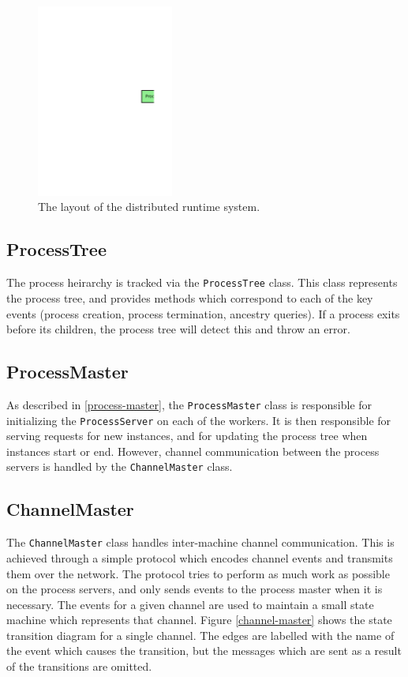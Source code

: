 \begin{figure}[H]
  \centering
  \includegraphics[width=0.4\textwidth]{diagrams/distributed_system}
  \caption{The layout of the distributed runtime system.}
  \label{dist-model}
\end{figure}

\subsection{ProcessTree}

The process heirarchy is tracked via the \texttt{ProcessTree} class. This class
represents the process tree, and provides methods which correspond to each of
the key events (process creation, process termination, ancestry queries). If
a process exits before its children, the process tree will detect this and throw
an error.

\subsection{ProcessMaster}

As described in \ref{process-master}, the \texttt{ProcessMaster} class is
responsible for initializing the \texttt{ProcessServer} on each of the workers.
It is then responsible for serving requests for new instances, and for updating
the process tree when instances start or end. However, channel communication
between the process servers is handled by the \texttt{ChannelMaster} class.

\subsection{ChannelMaster}

The \texttt{ChannelMaster} class handles inter-machine channel communication.
This is achieved through a simple protocol which encodes channel events and
transmits them over the network. The protocol tries to perform as much work as
possible on the process servers, and only sends events to the process master
when it is necessary. The events for a given channel are used to maintain
a small state machine which represents that channel. Figure \ref{channel-master}
shows the state transition diagram for a single channel.  The edges are labelled
with the name of the event which causes the transition, but the messages which
are sent as a result of the transitions are omitted.

